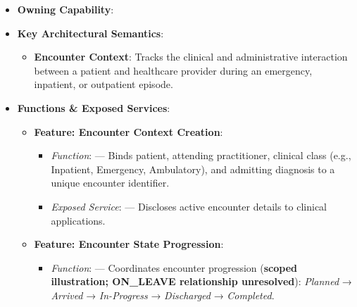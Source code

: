 \begin{itemize}

\item
\textbf{Owning Capability}: \texttt{}



\item
\textbf{Key Architectural Semantics}:


\begin{itemize}

\item
\textbf{Encounter Context}: Tracks the clinical and administrative interaction between a patient and healthcare provider during an emergency, inpatient, or outpatient episode.



\end{itemize}


\item
\textbf{Functions \& Exposed Services}:


\begin{itemize}

\item
\textbf{Feature: Encounter Context Creation}:


\begin{itemize}

\item
\emph{Function}: \texttt{} — Binds patient, attending practitioner, clinical class (e.g., Inpatient, Emergency, Ambulatory), and admitting diagnosis to a unique encounter identifier.



\item
\emph{Exposed Service}: \texttt{} — Discloses active encounter details to clinical applications.



\end{itemize}


\item
\textbf{Feature: Encounter State Progression}:


\begin{itemize}

\item
\emph{Function}: \texttt{} — Coordinates encounter progression (\textbf{scoped illustration; ON\_LEAVE relationship unresolved}): \emph{Planned} → \emph{Arrived} → \emph{In-Progress} → \emph{Discharged} → \emph{Completed}.




\end{itemize}
\end{itemize}
\end{itemize}
